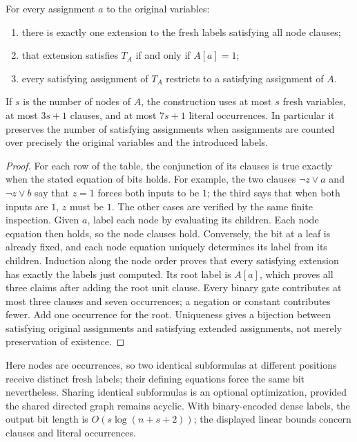 \begin{theorem}\label{ca-tseitin}
For every assignment $a$ to the original variables:
\begin{enumerate}
 \item there is exactly one extension to the fresh labels satisfying all
       node clauses;
 \item that extension satisfies $T_A$ if and only if $A[a]=1$;
 \item every satisfying assignment of $T_A$ restricts to a satisfying
       assignment of $A$.
\end{enumerate}
If $s$ is the number of nodes of $A$, the construction uses at most $s$
fresh variables, at most $3s+1$ clauses, and at most $7s+1$ literal
occurrences.  In particular it preserves the number of satisfying assignments
when assignments are counted over precisely the original variables and the
introduced labels.
\end{theorem}
\begin{proof}
For each row of the table, the conjunction of its clauses is true exactly
when the stated equation of bits holds.  For example, the two clauses
$\neg z\vee a$ and $\neg z\vee b$ say that $z=1$ forces both inputs to be
$1$; the third says that when both inputs are $1$, $z$ must be $1$.  The
other cases are verified by the same finite inspection.
Given $a$, label each node by evaluating its children.  Each node equation
then holds, so the node clauses hold.  Conversely, the bit at a leaf is
already fixed, and each node equation uniquely determines its label from its
children.  Induction along the node order proves that every satisfying
extension has exactly the labels just computed.  Its root label is $A[a]$,
which proves all three claims after adding the root unit clause.  Every
binary gate contributes at most three clauses and seven occurrences; a
negation or constant contributes fewer.  Add one occurrence for the root.
Uniqueness gives a bijection between satisfying original assignments and
satisfying extended assignments, not merely preservation of existence.
\end{proof}

Here nodes are occurrences, so two identical subformulas at different
positions receive distinct fresh labels; their defining equations force the
same bit nevertheless.  Sharing identical subformulas is an optional
optimization, provided the shared directed graph remains acyclic.  With
binary-encoded dense labels, the output bit length is
$O(s\log(n+s+2))$; the displayed linear bounds concern clauses and literal
occurrences.


